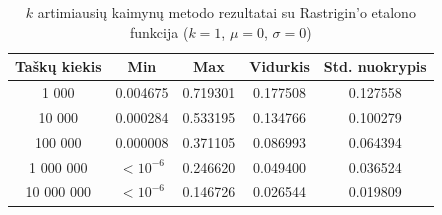 \begin{table}[H]
    \centering
    \begin{tabular}{|c|c|c|c|c|}
        \hline
        \textbf{Taškų kiekis} & \textbf{Min} & \textbf{Max} & \textbf{Vidurkis} & \textbf{Std. nuokrypis} \\ \hline
        1 000        & 0.004675 & 0.719301 & 0.177508 & 0.127558 \\ \hline
        10 000       & 0.000284 & 0.533195 & 0.134766 & 0.100279 \\ \hline
        100 000      & 0.000008 & 0.371105 & 0.086993 & 0.064394 \\ \hline
        1 000 000    & $<10^{-6}$ & 0.246620 & 0.049400 & 0.036524 \\ \hline
        10 000 000   & $<10^{-6}$ & 0.146726 & 0.026544 & 0.019809 \\ \hline
    \end{tabular}
    \caption{$k$ artimiausių kaimynų metodo rezultatai su Rastrigin'o etalono funkcija ($k = 1$, $\mu = 0$, $\sigma = 0$)}
\end{table}